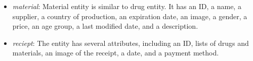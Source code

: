 \begin{itemize}
  \item \emph{material}: Material entity is similar to drug entity. It has an ID, a name, a supplier, a country of production, an expiration date, an image, a gender, a price, an age group, a last modified date, and a description. 
  \item  \emph{reciept}: The entity has several attributes, including an ID, lists of drugs and materials, an image of the receipt, a date, and a payment method. 
\end{itemize}


\
\\
\
\\
\
\\
\\
\
